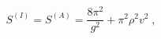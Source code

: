 \begin{equation}
\label{3-5}
S^{(I)} = S^{(A)} = \frac{8\pi^2}{g^2} + \pi^2\rho^2v^2
\;,
\end{equation}

